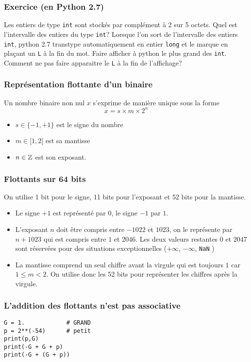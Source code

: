 \begin{frame}
  \frametitle{Exercice (en Python 2.7)}
Les entiers de type \texttt{int} sont stockés par complément à 2 sur 5 octets. Quel est l'intervalle des entiers du type \texttt{int}?\newline
Lorsque l'on sort de l'intervalle des entiers \texttt{int}, python 2.7 transtype automatiquement en entier \texttt{long} et le marque en plaçant un \texttt{L} à la fin du mot. Faire afficher à python le plus grand des \texttt{int}. Comment ne pas faire apparaitre le \texttt{L} à la fin de l'affichage?
\end{frame}

\begin{frame}
  \frametitle{Représentation flottante d'un binaire}
Un nombre binaire non nul $x$ s'exprime de manière unique sous la forme
\begin{displaymath}
 x = s\times m\times 2^n 
\end{displaymath}
\begin{itemize}
  \item $s\in\{-1,+1\}$ est le signe du nombre
  \item $m\in [1,2[$ est sa mantisse
  \item $n\in \mathbb{Z}$ est son exposant.  
\end{itemize}
\end{frame}

\begin{frame}
\frametitle{Flottants sur 64 bits}
On utilise 1 bit pour le signe, 11 bits pour l'exposant et 52 bits pour la mantisse.
\begin{itemize}
 \item Le signe $+1$ est représenté par $0$, le signe $-1$ par $1$.
 \item L'exposant $n$ doit être compris entre $-1022$ et $1023$, on le représente par $n + 1023$ qui est compris entre $1$ et $2046$. Les deux valeurs restantes $0$ et $2047$ sont réservées pour des situations exceptionnelles ($+\infty$, $-\infty$, \texttt{NaN} )
 \item La mantisse comprend un seul chiffre avant la virgule qui est toujours $1$ car $1\leq m <2$. On utilise donc les 52 bits pour représenter les chiffres après la virgule. 
\end{itemize}  
\end{frame}

\begin{frame}[fragile]
  \frametitle{L'addition des flottants n'est pas associative}
\begin{verbatim}
G = 1.            # GRAND
p = 2**(-54)      # petit
print(p,G)
print(-G + G + p)
print(-G + (G + p))
\end{verbatim}


\end{frame}



